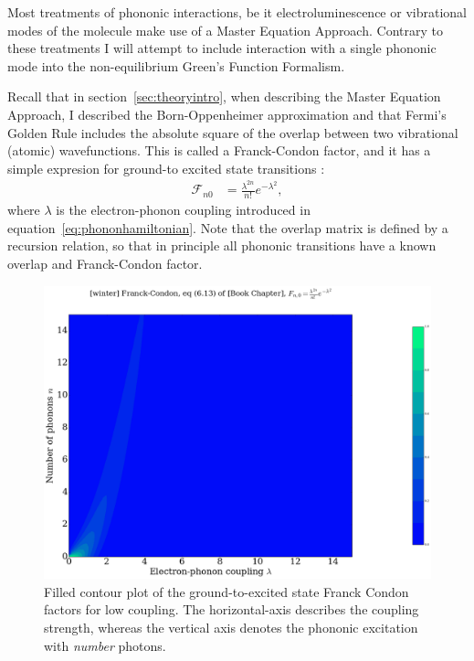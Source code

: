 Most treatments of phononic interactions, be it electroluminescence \cite{electroluminescence} or vibrational modes of the molecule \cite{vibrationcomputation} make use of a Master Equation Approach. Contrary to these treatments I will attempt to include interaction with a single phononic mode into the non-equilibrium Green's Function Formalism.

Recall that in section~\ref{sec:theoryintro}, when describing the Master Equation Approach, I described the Born-Oppenheimer approximation and that Fermi's Golden Rule includes the absolute square of the overlap between two vibrational (atomic) wavefunctions. This is called a Franck-Condon factor, and it has a simple expresion for ground-to excited state transitions \cite{kaspermothpoulsen}:
\begin{align}
\mathscr{F}_{n0} &= \frac{\lambda^{2n}}{n!} e^{-\lambda^2},
\label{eq:fcfactor}
\end{align}
where $\lambda$ is the electron-phonon coupling introduced in equation~\ref{eq:phononhamiltonian}.  Note that the overlap matrix is defined by a recursion relation, so that in principle all phononic transitions have a known overlap and Franck-Condon factor.

\begin{figure}[!bp]
    \centering
    \includegraphics[height=.3\textheight]{png/fcfig.png}
    \caption{Filled contour plot of the ground-to-excited state Franck Condon factors for low coupling. The horizontal-axis describes the coupling strength, whereas the vertical axis denotes the phononic excitation with \emph{number} photons.}
    \label{fig:fc}
\end{figure}

